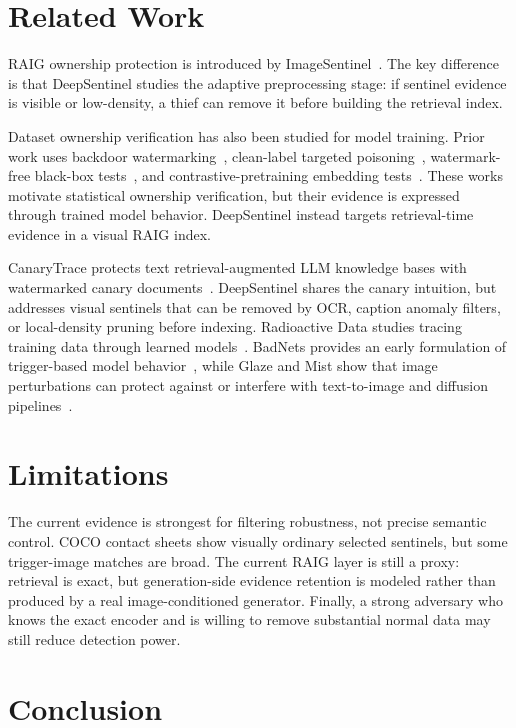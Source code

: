\documentclass[letterpaper,twocolumn,10pt]{article}
\begin{document}
\section{Related Work}

RAIG ownership protection is introduced by ImageSentinel~\cite{imagesentinel2025}.
The key difference is that DeepSentinel studies the adaptive preprocessing
stage: if sentinel evidence is visible or low-density, a thief can remove it
before building the retrieval index.

Dataset ownership verification has also been studied for model training. Prior
work uses backdoor watermarking~\cite{li2023blackboxdov}, clean-label targeted
poisoning~\cite{datataggants2025}, watermark-free black-box
tests~\cite{zeromark2024}, and contrastive-pretraining embedding
tests~\cite{dovcontrastive2025}. These works motivate statistical ownership
verification, but their evidence is expressed through trained model behavior.
DeepSentinel instead targets retrieval-time evidence in a visual RAIG index.

CanaryTrace protects text retrieval-augmented LLM knowledge bases with
watermarked canary documents~\cite{canarytrace2026}. DeepSentinel shares the
canary intuition, but addresses visual sentinels that can be removed by OCR,
caption anomaly filters, or local-density pruning before indexing. Radioactive
Data studies tracing training data through learned models~\cite{radioactive2020}.
BadNets provides an early formulation of trigger-based model
behavior~\cite{badnets2017}, while Glaze and Mist show that image perturbations
can protect against or interfere with text-to-image and diffusion
pipelines~\cite{glaze2023,mist2023}.

\section{Limitations}

The current evidence is strongest for filtering robustness, not precise semantic
control. COCO contact sheets show visually ordinary selected sentinels, but some
trigger-image matches are broad. The current RAIG layer is still a proxy:
retrieval is exact, but generation-side evidence retention is modeled rather
than produced by a real image-conditioned generator. Finally, a strong adversary
who knows the exact encoder and is willing to remove substantial normal data may
still reduce detection power.

\section{Conclusion}
\end{document}
